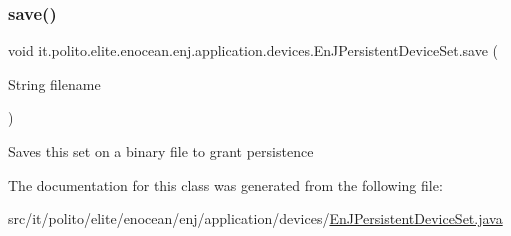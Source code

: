 \subsubsection{\texorpdfstring{save()}{save()}\hspace{0.1cm}{\footnotesize\ttfamily [2/2]}}
{\footnotesize\ttfamily void it.\+polito.\+elite.\+enocean.\+enj.\+application.\+devices.\+En\+J\+Persistent\+Device\+Set.\+save (\begin{DoxyParamCaption}\item[{String}]{filename }\end{DoxyParamCaption})}

Saves this set on a binary file to grant persistence 

The documentation for this class was generated from the following file\+:\begin{DoxyCompactItemize}
\item 
src/it/polito/elite/enocean/enj/application/devices/\hyperlink{_en_j_persistent_device_set_8java}{En\+J\+Persistent\+Device\+Set.\+java}\end{DoxyCompactItemize}
